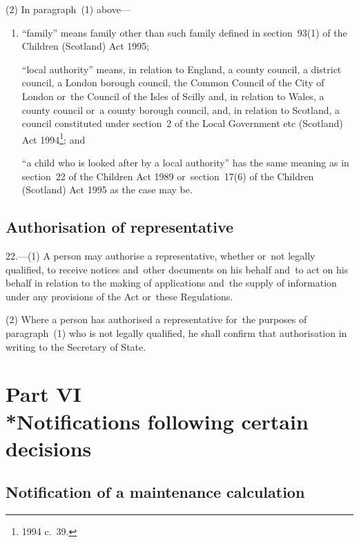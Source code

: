 \documentclass[12pt,a4paper]{article}
\begin{document}
(2) In paragraph~(1) above—
\begin{enumerate}\item[]
“family” means family other than such family defined in section~93(1) of the Children (Scotland) Act 1995;

\pagebreak[3]

“local authority” means, in relation to England, a county council, a district council, a London borough council, the Common Council of the City of London or~the Council of the Isles of Scilly and, in relation to Wales, a county council or~a county borough council, and, in relation to Scotland, a council constituted under section~2 of the Local Government etc (Scotland) Act 1994\footnote{1994 c.\ 39.}; and

“a child who is looked after by a local authority” has the same meaning as in section~22 of the Children Act 1989 or~section~17(6) of the Children (Scotland) Act 1995 as the case may be.
\end{enumerate}

\subsection[22. Authorisation of representative]{Authorisation of representative}

22.---(1)  A person may authorise a representative, whether or~not legally qualified, to receive notices and~other documents on his behalf and~to act on his behalf in relation to the making of applications and~the supply of information under any provisions of the Act or~these Regulations.

(2) Where a person has authorised a representative for~the purposes of paragraph~(1) who is not legally qualified, he shall confirm that authorisation in writing to the Secretary of State.

\section[Part VI --- Notifications following certain decisions]{Part VI\\*Notifications following certain decisions}

\renewcommand\parthead{--- Part VI}

\subsection[23. Notification of a maintenance calculation]{Notification of a maintenance calculation}
\end{document}
